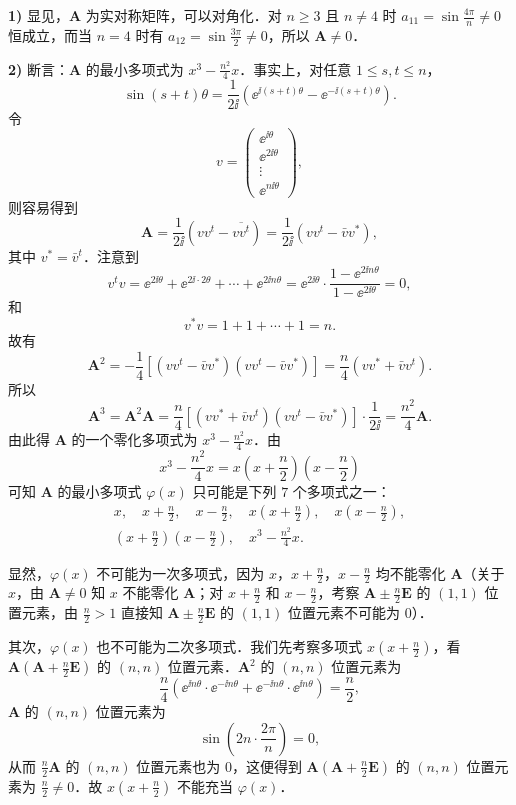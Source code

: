 \begin{solution}
\textbf{1)} 显见，$\bm{A}$ 为实对称矩阵，可以对角化．对 $n\ge 3$ 且 $n\neq 4$ 时 $a_{11}=\sin\frac{4\pi}{n}\neq 0$ 恒成立，而当 $n=4$ 时有 $a_{12}=\sin\frac{3\pi}{2}\neq 0$，所以 $\bm{A}\neq 0$．

\textbf{2)} 断言：$\bm{A}$ 的最小多项式为 $x^{3}-\frac{n^{2}}{4}x$．事实上，对任意 $1\le s,t\le n$，
\[
\sin(s+t)\theta=\frac{1}{2\ii}\left(\ee^{\ii(s+t)\theta}-\ee^{-\ii(s+t)\theta}\right).
\]
令
\[
v=\begin{pmatrix}\ee^{\ii\theta}\\ \ee^{2\ii\theta}\\ \vdots\\ \ee^{n\ii\theta}\end{pmatrix},
\]
则容易得到
\[
\bm{A}=\frac{1}{2\ii}\left(vv^{t}-\overline{vv^{t}}\right)=\frac{1}{2\ii}\left(vv^{t}-\bar{v}v^{*}\right),
\]
其中 $v^{*}=\bar{v}^{t}$．注意到
\[
v^{t}v=\ee^{2\ii\theta}+\ee^{2\ii\cdot 2\theta}+\cdots+\ee^{2\ii n\theta}=\ee^{2\ii\theta}\cdot\frac{1-\ee^{2\ii n\theta}}{1-\ee^{2\ii\theta}}=0,
\]
和
\[
v^{*}v=1+1+\cdots+1=n.
\]
故有
\[
\bm{A}^{2}=-\frac{1}{4}\left[\left(vv^{t}-\bar{v}v^{*}\right)\left(vv^{t}-\bar{v}v^{*}\right)\right]=\frac{n}{4}\left(vv^{*}+\bar{v}v^{t}\right).
\]
所以
\[
\bm{A}^{3}=\bm{A}^{2}\bm{A}=\frac{n}{4}\left[\left(vv^{*}+\bar{v}v^{t}\right)\left(vv^{t}-\bar{v}v^{*}\right)\right]\cdot\frac{1}{2\ii}=\frac{n^{2}}{4}\bm{A}.
\]
由此得 $\bm{A}$ 的一个零化多项式为 $x^{3}-\frac{n^{2}}{4}x$．由
\[
x^{3}-\frac{n^{2}}{4}x=x\left(x+\frac{n}{2}\right)\left(x-\frac{n}{2}\right)
\]
可知 $\bm{A}$ 的最小多项式 $\varphi(x)$ 只可能是下列 $7$ 个多项式之一：
\begin{gather*}
x,\quad x+\frac{n}{2},\quad x-\frac{n}{2},\quad x\left(x+\frac{n}{2}\right),\quad x\left(x-\frac{n}{2}\right),\\
\left(x+\frac{n}{2}\right)\left(x-\frac{n}{2}\right),\quad x^{3}-\frac{n^{2}}{4}x.
\end{gather*}

显然，$\varphi(x)$ 不可能为一次多项式，因为 $x$，$x+\frac{n}{2}$，$x-\frac{n}{2}$ 均不能零化 $\bm{A}$（关于 $x$，由 $\bm{A}\neq 0$ 知 $x$ 不能零化 $\bm{A}$；对 $x+\frac{n}{2}$ 和 $x-\frac{n}{2}$，考察 $\bm{A}\pm\frac{n}{2}\bm{E}$ 的 $(1,1)$ 位置元素，由 $\frac{n}{2}>1$ 直接知 $\bm{A}\pm\frac{n}{2}\bm{E}$ 的 $(1,1)$ 位置元素不可能为 $0$）．

其次，$\varphi(x)$ 也不可能为二次多项式．我们先考察多项式 $x\left(x+\frac{n}{2}\right)$，看 $\bm{A}\left(\bm{A}+\frac{n}{2}\bm{E}\right)$ 的 $(n,n)$ 位置元素．$\bm{A}^{2}$ 的 $(n,n)$ 位置元素为
\[
\frac{n}{4}\left(\ee^{\ii n\theta}\cdot\ee^{-\ii n\theta}+\ee^{-\ii n\theta}\cdot\ee^{\ii n\theta}\right)=\frac{n}{2},
\]
$\bm{A}$ 的 $(n,n)$ 位置元素为
\[
\sin\left(2n\cdot\frac{2\pi}{n}\right)=0,
\]
从而 $\frac{n}{2}\bm{A}$ 的 $(n,n)$ 位置元素也为 $0$，这便得到 $\bm{A}\left(\bm{A}+\frac{n}{2}\bm{E}\right)$ 的 $(n,n)$ 位置元素为 $\frac{n}{2}\neq 0$．故 $x\left(x+\frac{n}{2}\right)$ 不能充当 $\varphi(x)$．


\end{solution}

